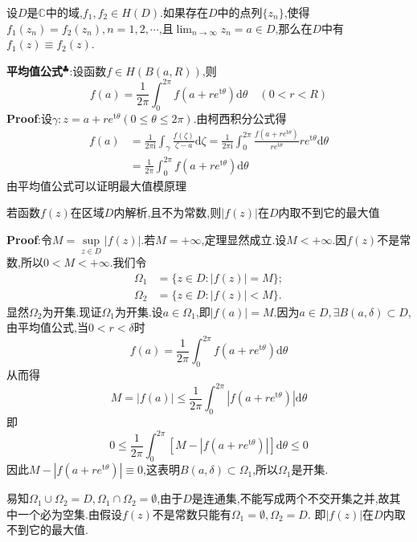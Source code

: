 \begin{tcolorbox}[colback=KuangNei,colframe=BianKuang,title=\textbf{唯一性定理},sharpish corners]
    设$D$是$\mathbb{C}$中的域,$f_1,f_2\in H(D)$.如果存在$D$中的点列$\{z_n\}$,使得$f_1(z_n)=f_2(z_n),n=1,2,\cdots$,且$\lim_{n\to \infty}z_n=a\in D$,那么在$D$中有$f_1(z)\equiv f_2(z)$.
\end{tcolorbox}
\textbf{平均值公式}$^\clubsuit$:设函数$f\in H(B(a,R))$,则
$$
f(a)=\frac{1}{2\pi}\int_0^{2\pi}f(a+re^{\mathrm{t}\theta})\mathrm{d}\theta\quad (0<r<R)
$$
\qquad \textbf{Proof}:设$\gamma:z=a+re^{\mathrm{t}\theta}(0\leqslant \theta\leqslant 2\pi)$.由柯西积分公式得
$$
\begin{aligned}
    f(a) &=\frac{1}{2\pi\mathrm{i}}\int_{\gamma}\frac{f(\zeta)}{\zeta-a}\mathrm{d}\zeta=\frac{1}{2\pi\mathrm{i}}\int_0^{2\pi}\frac{f(a+re^{\mathrm{t}\theta})}{re^{\mathrm{t}\theta}}re^{\mathrm{t}\theta}\mathrm{d}\theta\\
         &= \frac{1}{2\pi}\int_0^{2\pi}f(a+re^{\mathrm{t}\theta})\mathrm{d}\theta
\end{aligned}
$$
由平均值公式可以证明最大值模原理
\begin{tcolorbox}[colback=KuangNei,colframe=BianKuang,title=\textbf{最大模原理},sharpish corners]
    若函数$f(z)$在区域$D$内解析,且不为常数,则$|f(z)|$在$D$内取不到它的最大值
\end{tcolorbox}
\textbf{Proof}:令$M=\sup\limits_{z\in D}|f(z)|$.若$M=+\infty$,定理显然成立.设$M<+\infty$.因$f(z)$不是常数,所以$0<M<+\infty$.我们令
$$
\begin{aligned}
    \Omega_1 &= \{z\in D:|f(z)|=M\};\\
    \Omega_2 &= \{z\in D:|f(z)|<M\}.
\end{aligned}
$$
显然$\Omega_2$为开集.现证$\Omega_1$为开集.设$a\in \Omega_1$,即$|f(a)|=M$.因为$a\in D,\exists B(a,\delta)\subset D$,由平均值公式,当$0<r<\delta$时
$$
f(a)=\frac{1}{2\pi}\int_0^{2\pi}f(a+re^{\mathrm{t}\theta})\mathrm{d}\theta
$$
从而得
$$
M=|f(a)|\leqslant \frac{1}{2\pi}\int_0^{2\pi}|f(a+re^{\mathrm{t}\theta})|\mathrm{d}\theta
$$
即
$$
0\leqslant \frac{1}{2\pi}\int_0^{2\pi}[M-|f(a+re^{\mathrm{t}\theta})|]\mathrm{d}\theta\leqslant 0
$$
因此$M-|f(a+re^{\mathrm{t}\theta})|\equiv 0$,这表明$B(a,\delta)\subset \Omega_1$,所以$\Omega_1$是开集.\par
易知$\Omega_1\cup \Omega_2=D,\Omega_1\cap\Omega_2=\emptyset$,由于$D$是连通集,不能写成两个不交开集之并,故其中一个必为空集.由假设$f(z)$不是常数只能有$\Omega_1=\emptyset,\Omega_2=D$.
即$|f(z)|$在$D$内取不到它的最大值.\par
